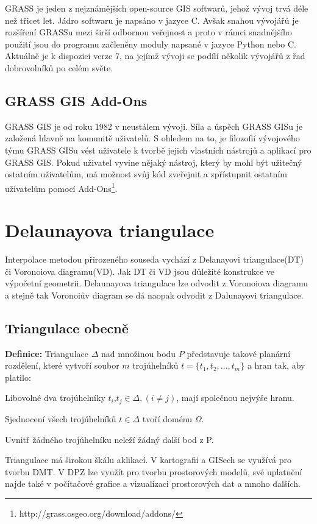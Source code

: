 \documentclass[12pt,a4paper]{article}
\begin{document}
GRASS je jeden z nejznámějších open-source GIS softwarů, jehož vývoj trvá déle než třicet let. Jádro softwaru je napsáno v jazyce C. Avšak snahou vývojářů je rozšíření GRASSu mezi širší odbornou veřejnost a proto v rámci snadnějšího použití jsou do programu začleněny moduly napsané v jazyce Python nebo C. Aktuálně je k dispozici verze 7, na jejímž vývoji se podílí několik vývojářů z řad dobrovolníků po celém světe.

\subsection{GRASS GIS Add-Ons}
GRASS GIS je od roku 1982 v neustálem vývoji. Síla a úspěch GRASS GISu je založená hlavně na komunitě uživatelů. S ohledem na to, je filozofií vývojového týmu GRASS GISu vést uživatele k tvorbě jejich vlastních nástrojů a aplikací pro GRASS GIS. Pokud uživatel vyvine nějaký nástroj, který by mohl být užitečný ostatním uživatelům, má možnost svůj kód zveřejnit a zpřístupnit ostatním uživatelům pomocí Add-Ons\footnote{http://grass.osgeo.org/download/addons/}.

\newpage
\section{Delaunayova triangulace}
Interpolace metodou přirozeného souseda vychází z Delanayovi triangulace(DT) či Voronoiova diagramu(VD). Jak DT či VD jsou důležité konstrukce ve výpočetní geometrii. Delaunayova triangulace lze odvodit z Voronoiova diagramu a stejně tak Voronoiův diagram se dá naopak odvodit z Dalunayovi triangulace.

\subsection{Triangulace obecně}
\textbf{Definice\cite{TB1}:}
Triangulace $\Delta$ nad množinou bodu $P$ představuje takové planární rozdělení, které vytvoří soubor $m$ trojúhelníků $t = \{ t_1, t_2,...,t_m \}$ a hran tak, aby platilo:

Libovolné dva trojúhelníky $t_i$,$t_j \in \Delta, (i \neq j)$, mají společnou nejvýše hranu.

Sjednocení všech trojúhelníků $t \in \Delta$ tvoří doménu $\Omega$.

Uvnitř žádného trojúhelníku neleží žádný další bod z P.

\bigskip
Triangulace má širokou škálu aklikací. V kartografii a GISech se využívá pro tvorbu DMT. V DPZ lze využít pro tvorbu prostorových modelů, své uplatnění najde také v počítačové grafice a vizualizaci prostorových dat a mnoho dalších.
\end{document}
